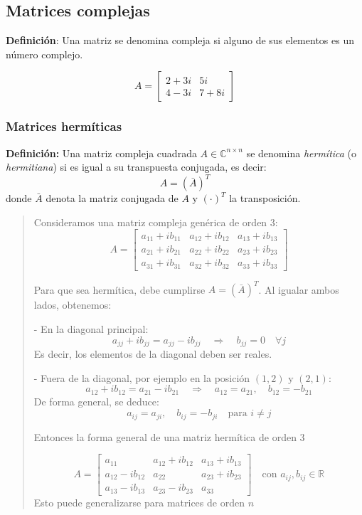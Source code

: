 \subsection{Matrices complejas}

\textbf{Definición}: Una matriz se denomina compleja si alguno de sus elementos es un número complejo.

\[
A = \begin{bmatrix}
  2+3i & 5i \\
  4-3i & 7+8i
\end{bmatrix}
\]
\subsubsection{Matrices hermíticas}

\textbf{Definición:}  
Una matriz compleja cuadrada \(A \in \mathbb{C}^{n \times n}\) se denomina \textit{hermítica} (o \textit{hermitiana}) si es igual a su transpuesta conjugada, es decir:
\[
A = (\bar{A})^T
\]
donde \(\bar{A}\) denota la matriz conjugada de \(A\) y \((\cdot)^T\) la transposición.

\begin{quote}

  Consideramos una matriz compleja genérica de orden 3:
  \[
  A = \begin{bmatrix}
  a_{11} + ib_{11} & a_{12} + ib_{12} & a_{13} + ib_{13} \\
  a_{21} + ib_{21} & a_{22} + ib_{22} & a_{23} + ib_{23} \\
  a_{31} + ib_{31} & a_{32} + ib_{32} & a_{33} + ib_{33}
  \end{bmatrix}
  \]

  Para que sea hermítica, debe cumplirse \(A = (\bar{A})^T\). Al igualar ambos lados, obtenemos:

  - En la diagonal principal:
  \[
  a_{jj} + ib_{jj} = a_{jj} - ib_{jj} \quad \Rightarrow \quad b_{jj} = 0 \quad \forall j
  \]
  Es decir, los elementos de la diagonal deben ser reales.

  - Fuera de la diagonal, por ejemplo en la posición \((1,2)\) y \((2,1)\):
  \[
  a_{12} + ib_{12} = a_{21} - ib_{21} \quad \Rightarrow \quad a_{12} = a_{21}, \quad b_{12} = -b_{21}
  \]
  De forma general, se deduce:
  \[
  a_{ij} = a_{ji}, \quad b_{ij} = -b_{ji} \quad \text{para } i \ne j
  \]

  Entonces la forma general de una matriz hermítica de orden 3

  \[
  A = \begin{bmatrix}
  a_{11} & a_{12} + ib_{12} & a_{13} + ib_{13} \\
  a_{12} - ib_{12} & a_{22} & a_{23} + ib_{23} \\
  a_{13} - ib_{13} & a_{23} - ib_{23} & a_{33}
  \end{bmatrix}
  \quad \text{con } a_{ij}, b_{ij} \in \mathbb{R}
  \]
  Esto puede generalizarse para matrices de orden \(n\)
\end{quote}


